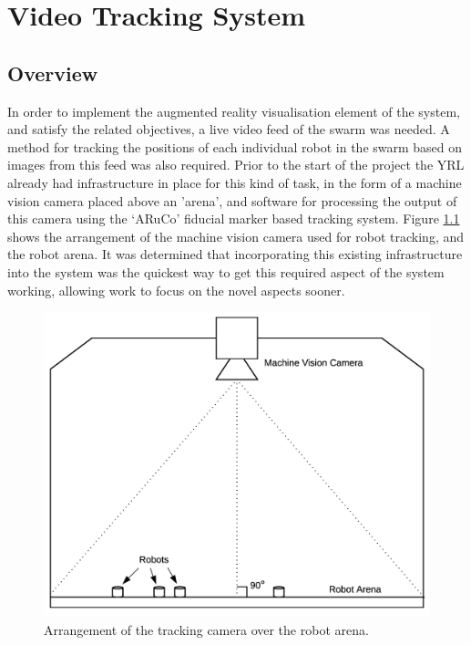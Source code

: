 
\chapter[Video Tracking System]{Video Tracking System} %

\label{Chapter6} %


\section{Overview}
In order to implement the augmented reality visualisation element of the system, and satisfy the related objectives, a live video feed of the swarm was needed. A method for tracking the positions of each individual robot in the swarm based on images from this feed was also required. Prior to the start of the project the YRL already had infrastructure in place for this kind of task, in the form of a machine vision camera placed above an 'arena', and software for processing the output of this camera using the `ARuCo\cite{Garrido:2014}' fiducial marker based tracking system. Figure \ref{fig:CameraLayout} shows the arrangement of the machine vision camera used for robot tracking, and the robot arena. It was determined that incorporating this existing infrastructure into the system was the quickest way to get this required aspect of the system working, allowing work to focus on the novel aspects sooner.

\begin{figure}
	\centering
	\includegraphics[scale=0.3]{Figures/CameraLayout.png}
	\decoRule
	\caption[Tracking Camera Arrangement]{Arrangement of the tracking camera over the robot arena.}
	\label{fig:CameraLayout}
\end{figure}

